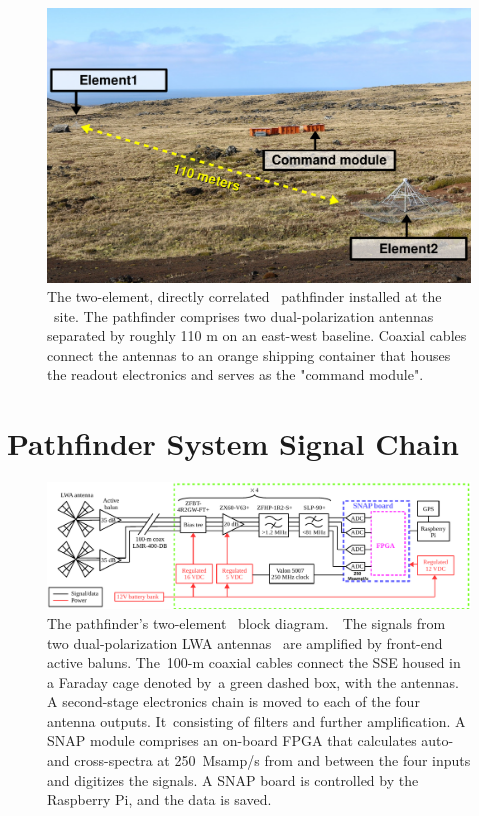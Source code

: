 \begin{figure}
	\centering
	\includegraphics[width=\linewidth]{Figures/Albatros}
	\caption{The two-element, directly correlated \albatros\ pathfinder installed at the \prizm\ site. The pathfinder comprises two dual-polarization antennas separated by roughly 110 m on an east-west baseline. Coaxial cables connect the antennas to an orange shipping container that houses the readout electronics and serves as the "command module".}
	\label{Fig:albatros2}
\end{figure}

\section{Pathfinder System Signal Chain}

\begin{figure}
	\begin{center} \includegraphics[width=\linewidth]{Figures/pathfinder_schematic.pdf}
		\caption{The pathfinder's two-element \albatros\ block diagram.  The signals from two dual-polarization LWA antennas~\citep{2012PASP..124.1090H} are amplified by front-end active baluns. The 100-m coaxial cables connect the SSE housed in a Faraday cage denoted by a green dashed box, with the antennas. A second-stage electronics chain is moved to each of the four antenna outputs. It consisting of filters and further amplification. A SNAP module comprises an on-board FPGA that calculates auto- and cross-spectra at 250~Msamp/s from and between the four inputs and digitizes the signals. A SNAP board is controlled by the Raspberry Pi, and the data is saved.}
		\label{Fig:albatros2_schem}
	\end{center}
\end{figure}

